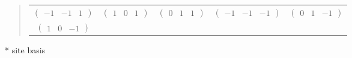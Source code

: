 \documentclass[fleqn,9pt,landscape]{jsarticle}
\begin{document}
\begin{quote}
\begin{tabular}{ccccc}
$ \begin{pmatrix} -1 & -1 & 1 \end{pmatrix} $ & $ \begin{pmatrix} 1 & 0 & 1 \end{pmatrix} $ & $ \begin{pmatrix} 0 & 1 & 1 \end{pmatrix} $ & $ \begin{pmatrix} -1 & -1 & -1 \end{pmatrix} $ & $ \begin{pmatrix} 0 & 1 & -1 \end{pmatrix} $ \\
$ \begin{pmatrix} 1 & 0 & -1 \end{pmatrix} $ & $  $ & $  $ & $  $ & $  $
\end{tabular}
\end{quote}
* site basis
\end{document}
